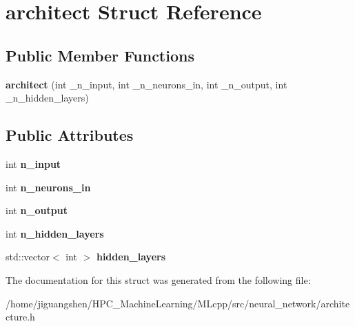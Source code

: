 \hypertarget{structarchitect}{\section{architect Struct Reference}
\label{structarchitect}
}
\subsection*{Public Member Functions}
\begin{DoxyCompactItemize}
\item 
\hypertarget{structarchitect_a99c79563ccc588dce6b82d698eafe5c6}{{\bfseries architect} (int \-\_\-n\-\_\-input, int \-\_\-n\-\_\-neurons\-\_\-in, int \-\_\-n\-\_\-output, int \-\_\-n\-\_\-hidden\-\_\-layers)}\label{structarchitect_a99c79563ccc588dce6b82d698eafe5c6}

\end{DoxyCompactItemize}
\subsection*{Public Attributes}
\begin{DoxyCompactItemize}
\item 
\hypertarget{structarchitect_ad8a4aff337e1663e4e1cecd287801324}{int {\bfseries n\-\_\-input}}\label{structarchitect_ad8a4aff337e1663e4e1cecd287801324}

\item 
\hypertarget{structarchitect_aa497f36cba5fbefcf02c57a205946281}{int {\bfseries n\-\_\-neurons\-\_\-in}}\label{structarchitect_aa497f36cba5fbefcf02c57a205946281}

\item 
\hypertarget{structarchitect_ae249c285dcff96d6f04fc6920a022ad7}{int {\bfseries n\-\_\-output}}\label{structarchitect_ae249c285dcff96d6f04fc6920a022ad7}

\item 
\hypertarget{structarchitect_a37f826b92644cdd5f4b87c8e39bfda05}{int {\bfseries n\-\_\-hidden\-\_\-layers}}\label{structarchitect_a37f826b92644cdd5f4b87c8e39bfda05}

\item 
\hypertarget{structarchitect_aa1580a7e92b1199ebdacdea824d5f451}{std\-::vector$<$ int $>$ {\bfseries hidden\-\_\-layers}}\label{structarchitect_aa1580a7e92b1199ebdacdea824d5f451}

\end{DoxyCompactItemize}


The documentation for this struct was generated from the following file\-:\begin{DoxyCompactItemize}
\item 
/home/jiguangshen/\-H\-P\-C\-\_\-\-Machine\-Learning/\-M\-Lcpp/src/neural\-\_\-network/architecture.\-h\end{DoxyCompactItemize}
